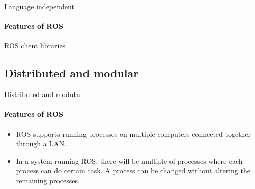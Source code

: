 \documentclass{beamer}
\begin{document}
\begin{frame}{Language independent}
    \framesubtitle{Features of ROS}    
 
    ROS client libraries 

    \vspace{0.5cm}
    \centering
{}

\end{frame}


\subsection{Distributed and modular}

\begin{frame}{Distributed and modular}
    \framesubtitle{Features of ROS}    
    \begin{itemize}
        \item ROS supports running processes on multiple computers connected together through a LAN.
        \item In a system running ROS, there will be multiple of processes where each process can do certain task. A process can be changed without altering the remaining processes.
    \end{itemize}
\end{frame}
\end{document}
